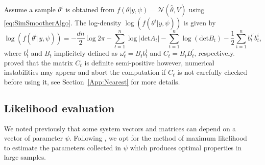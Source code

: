 \documentclass{article}
\begin{document}
Assume a sample $\theta^i$ is obtained from $f(\theta|y,\psi) = \mathcal{N}(\hat{\theta},V)$
using \eqref{eq:SimSmootherAlgo}. The log-density $\log(f(\theta^i|y,\psi))$ is given by
\begin{equation}
   \log(f(\theta^i|y,\psi)) = -\frac{dn}{2} \log{2 \pi} - \displaystyle \sum_{t=1}^n \log{|\text{det}A_t|} - \displaystyle \sum_{t=1}^n \log{(\text{det}B_t)} - \frac{1}{2} \displaystyle \sum_{t=1}^n b_t^{i \prime} b_t^{i},
  \label{eq:logLikSimSampl}
\end{equation}
where $b_t^{i}$ and $B_t$ implicitely defined as $ \omega _t^i = B_t b_t^i $ and
$C_t=B_tB_t^\prime$, respectively. \citet{jungbacker2007monte} proved that the matrix $C_t$
is definite semi-positive however, numerical instabilities may appear and abort the
computation if $C_t$ is not carefully checked before using it, see Section~\ref{App:Nearest}
for more details.

\subsection{Likelihood evaluation}
\label{sec:ImportanceSamplingLik}

We noted previously that some system vectors and matrices can depend on a vector of parameter
$\psi$. Following \citet{durbin2012time}, we opt for the method of maximum likelihood to
estimate the parameters collected in $\psi $ which produces optimal properties in large
samples.
\end{document}
